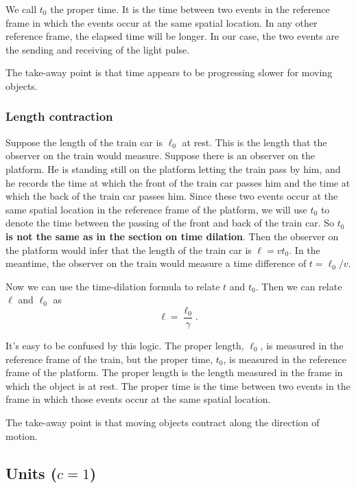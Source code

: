 \documentclass{article}
\begin{document}
We call $t_0$ the proper time. It is the time between two events in the reference frame in which the events occur at the same spatial location. In any other reference frame, the elapsed time will be longer. In our case, the two events are the sending and receiving of the light pulse.

The take-away point is that time appears to be progressing slower for moving objects.

\subsubsection*{Length contraction}

Suppose the length of the train car is $\ell_0$ at rest. This is the length that the observer on the train would measure. Suppose there is an observer on the platform. He is standing still on the platform letting the train pass by him, and he records the time at which the front of the train car passes him and the time at which the back of the train car passes him. Since these two events occur at the same spatial location in the reference frame of the platform, we will use $t_0$ to denote the time between the passing of the front and back of the train car. So {\bf $t_0$ is not the same as in the section on time dilation}. Then the observer on the platform would infer that the length of the train car is $\ell = v t_0$. In the meantime, the observer on the train would measure a time difference of $t = \ell_0 / v$.

Now we can use the time-dilation formula to relate $t$ and $t_0$. Then we can relate $\ell$ and $\ell_0$ as \begin{equation} \ell = \frac{\ell_0}{\gamma} . \end{equation}

It's easy to be confused by this logic. The proper length, $\ell_0$, is measured in the reference frame of the train, but the proper time, $t_0$, is measured in the reference frame of the platform. The proper length is the length measured in the frame in which the object is at rest. The proper time is the time between two events in the frame in which those events occur at the same spatial location.

The take-away point is that moving objects contract along the direction of motion.

\subsection*{Units ($c = 1$)}
\end{document}
